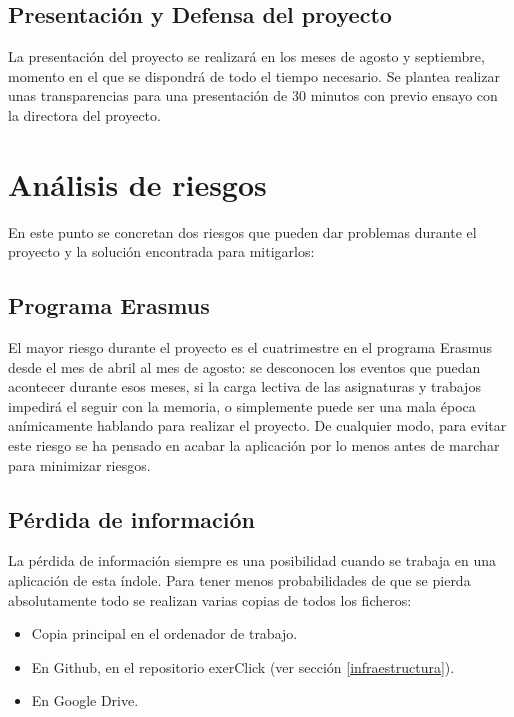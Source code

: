 \subsection{Presentación y Defensa del proyecto}

La presentación del proyecto se realizará en los meses de agosto y septiembre, momento en el que se dispondrá de todo el tiempo necesario. Se plantea realizar unas transparencias para una presentación de 30 minutos con previo ensayo con la directora del proyecto.\\


\section{Análisis de riesgos}

En este punto se concretan dos riesgos que pueden dar problemas durante el proyecto y la solución encontrada para mitigarlos:\\

\subsection*{Programa Erasmus}

El mayor riesgo durante el proyecto es el cuatrimestre en el programa Erasmus desde el mes de abril al mes de agosto: se desconocen los eventos que puedan acontecer durante esos meses, si la carga lectiva de las asignaturas y trabajos impedirá el seguir con la memoria, o simplemente puede ser una mala época anímicamente hablando para realizar el proyecto. De cualquier modo, para evitar este riesgo se ha pensado en acabar la aplicación por lo menos antes de marchar para minimizar riesgos.\\

\subsection*{Pérdida de información}

La pérdida de información siempre es una posibilidad cuando se trabaja en una aplicación de esta índole. Para tener menos probabilidades de que se pierda absolutamente todo se realizan varias copias de todos los ficheros:

\begin{itemize}
\item Copia principal en el ordenador de trabajo.
\item En Github, en el repositorio exerClick (ver sección \ref{infraestructura}).
\item En Google Drive.
\end{itemize}

